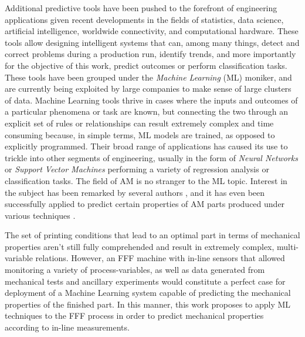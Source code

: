 \documentclass[main.tex]{subfiles}
\begin{document}
Additional predictive tools have been pushed to the forefront of engineering applications given recent developments in the fields of statistics, data science, artificial intelligence, worldwide connectivity, and computational hardware. These tools allow designing intelligent systems that can, among many things, detect and correct problems during a production run, identify trends, and more importantly for the objective of this work, predict outcomes or perform classification tasks. These tools have been grouped under the \emph{Machine Learning} (ML) moniker, and are currently being exploited by large companies to make sense of large clusters of data. Machine Learning tools thrive in cases where the inputs and outcomes of a particular phenomena or task are known, but connecting the two through an explicit set of rules or relationships can result extremely complex and time consuming \cite{Chollet2018} because, in simple terms, ML models are trained, as opposed to explicitly programmed. Their broad range of applications has caused its use to trickle into other segments of engineering, usually in the form of \emph{Neural Networks} or \emph{Support Vector Machines} performing a variety of regression analysis or classification tasks. The field of AM is no stranger to the ML topic. Interest in the subject has been remarked by several authors \cite{Qi2019, Razvi2019, Meng2020}, and it has even been successfully applied to predict certain properties of AM parts produced under various techniques \cite{Qi2019, Razvi2019, Meng2020, Sood2012}. 

The set of printing conditions that lead to an optimal part in terms of mechanical properties aren't still fully comprehended and result in extremely complex, multi-variable relations. However, an FFF machine with in-line sensors that allowed monitoring a variety of process-variables, as well as data generated from mechanical tests and ancillary experiments would constitute a perfect case for deployment of a Machine Learning system capable of predicting the mechanical properties of the finished part. In this manner, this work proposes to apply ML techniques to the FFF process in order to predict mechanical properties according to in-line measurements.

% 
%
%
%
%
%
%
%
\end{document}

